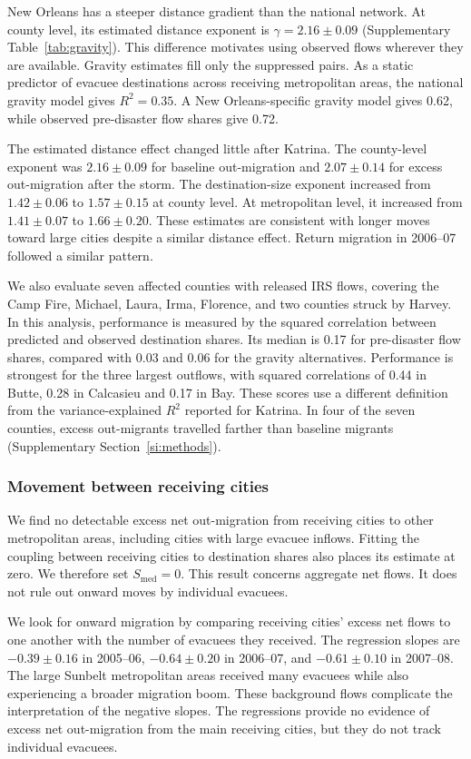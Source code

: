 \documentclass[11pt]{article}
\begin{document}
New Orleans has a steeper distance gradient than the national network. At county level, its estimated distance exponent is $\gamma=2.16\pm0.09$ (Supplementary Table~\ref{tab:gravity}). This difference motivates using observed flows wherever they are available. Gravity estimates fill only the suppressed pairs. As a static predictor of evacuee destinations across receiving metropolitan areas, the national gravity model gives $R^2=0.35$. A New Orleans-specific gravity model gives 0.62, while observed pre-disaster flow shares give 0.72.

The estimated distance effect changed little after Katrina. The county-level exponent was $2.16\pm0.09$ for baseline out-migration and $2.07\pm0.14$ for excess out-migration after the storm. The destination-size exponent increased from $1.42\pm0.06$ to $1.57\pm0.15$ at county level. At metropolitan level, it increased from $1.41\pm0.07$ to $1.66\pm0.20$. These estimates are consistent with longer moves toward large cities despite a similar distance effect. Return migration in 2006--07 followed a similar pattern.

We also evaluate seven affected counties with released IRS flows, covering the Camp Fire, Michael, Laura, Irma, Florence, and two counties struck by Harvey. In this analysis, performance is measured by the squared correlation between predicted and observed destination shares. Its median is 0.17 for pre-disaster flow shares, compared with 0.03 and 0.06 for the gravity alternatives. Performance is strongest for the three largest outflows, with squared correlations of 0.44 in Butte, 0.28 in Calcasieu and 0.17 in Bay. These scores use a different definition from the variance-explained $R^2$ reported for Katrina. In four of the seven counties, excess out-migrants travelled farther than baseline migrants (Supplementary Section~\ref{si:methods}).

\subsubsection{Movement between receiving cities}
\label{si:host}
We find no detectable excess net out-migration from receiving cities to other metropolitan areas, including cities with large evacuee inflows. Fitting the coupling between receiving cities to destination shares also places its estimate at zero. We therefore set $S_{\text{med}}=0$. This result concerns aggregate net flows. It does not rule out onward moves by individual evacuees.

We look for onward migration by comparing receiving cities' excess net flows to one another with the number of evacuees they received. The regression slopes are $-0.39\pm0.16$ in 2005--06, $-0.64\pm0.20$ in 2006--07, and $-0.61\pm0.10$ in 2007--08. The large Sunbelt metropolitan areas received many evacuees while also experiencing a broader migration boom. These background flows complicate the interpretation of the negative slopes. The regressions provide no evidence of excess net out-migration from the main receiving cities, but they do not track individual evacuees.
\end{document}
